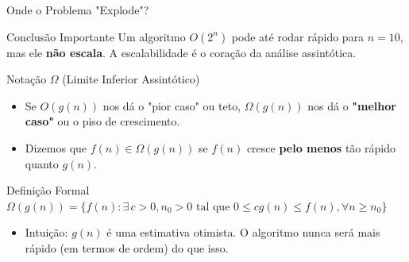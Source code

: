 \documentclass[aspectratio=169]{beamer}
\begin{document}
\begin{frame}{Onde o Problema "Explode"? }
    \centering

    \begin{block}{Conclusão Importante}
        Um algoritmo $O(2^n)$ pode até rodar rápido para $n=10$, mas ele \textbf{não escala}. A escalabilidade é o coração da análise assintótica.
    \end{block}
\end{frame}


\begin{frame}{Notação $\Omega$ (Limite Inferior Assintótico)}
    \begin{itemize}
        \item Se $O(g(n))$ nos dá o "pior caso" ou teto, $\Omega(g(n))$ nos dá o \textbf{"melhor caso"} ou o piso de crescimento.
        \item Dizemos que $f(n) \in \Omega(g(n))$ se $f(n)$ cresce \textbf{pelo menos} tão rápido quanto $g(n)$.
    \end{itemize}
    
    \begin{block}{Definição Formal}
        $\Omega(g(n)) = \{ f(n) : \exists \, c > 0, n_0 > 0 \text{ tal que } 0 \le cg(n) \le f(n), \forall n \ge n_0 \}$
    \end{block}
    
    \begin{itemize}
        \item Intuição: $g(n)$ é uma estimativa otimista. O algoritmo nunca será mais rápido (em termos de ordem) do que isso.
    \end{itemize}
\end{frame}
\end{document}
